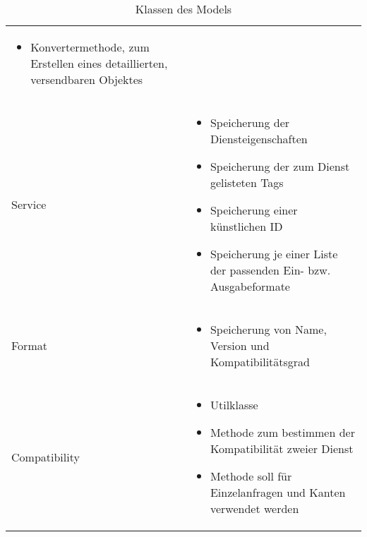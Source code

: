 \begin{table}[h]
\begin{tabularx}{\textwidth}{p{} | X}
\begin{itemize}
			\item Konvertermethode, zum Erstellen eines detaillierten, versendbaren Objektes
		\end{itemize} \\
		Service & \compress \begin{itemize}
			\item Speicherung der Diensteigenschaften
			\item Speicherung der zum Dienst gelisteten Tags
			\item Speicherung einer künstlichen ID
			\item Speicherung je einer Liste der passenden Ein- bzw. Ausgabeformate
		\end{itemize} \\
		\rowcolor[HTML]{E7E7E7}
		Format & \compress \begin{itemize}
			\item Speicherung von Name, Version und Kompatibilitätsgrad
		\end{itemize} \\
		Compatibility & \compress \begin{itemize}
			\item Utilklasse
			\item Methode zum bestimmen der Kompatibilität zweier Dienst
			\item Methode soll für Einzelanfragen und Kanten verwendet werden
		\end{itemize} \\
	\end{tabularx}
	\caption{Klassen des Models}
	\label{table:klassenbeschreibung-a}
\end{table}

